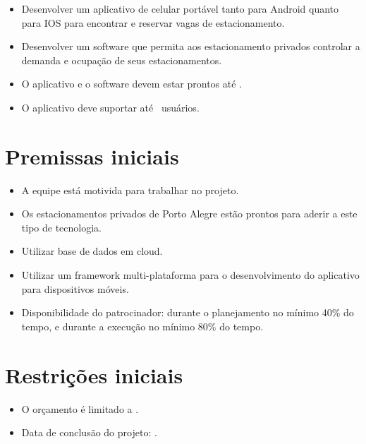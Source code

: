 
\begin{itemize}
	\item Desenvolver um aplicativo de celular portável tanto para Android quanto para IOS para encontrar e reservar vagas de estacionamento.
	\item Desenvolver um software que permita aos estacionamento privados controlar a demanda e ocupação de seus estacionamentos.
	\item O aplicativo e o software devem estar prontos até \maximumDeadline{}.
	\item O aplicativo deve suportar até \minimumUsersAmount{}\ usuários.
\end{itemize}




\section{Premissas iniciais}

\begin{itemize}
	\item A equipe está motivida para trabalhar no projeto.
	\item Os estacionamentos privados de Porto Alegre estão prontos para aderir a este tipo de tecnologia.
	\item Utilizar base de dados em cloud.
	\item Utilizar um framework multi-plataforma para o desenvolvimento do aplicativo para dispositivos móveis.
	\item Disponibilidade do patrocinador: durante o planejamento no mínimo 40\% do tempo, e durante a execução no mínimo 80\% do tempo.
\end{itemize}

\section{Restrições iniciais}

\begin{itemize}
	\item O orçamento é limitado a \maximumBudget{}.
	\item Data de conclusão do projeto: \maximumDeadline{}.
\end{itemize}

